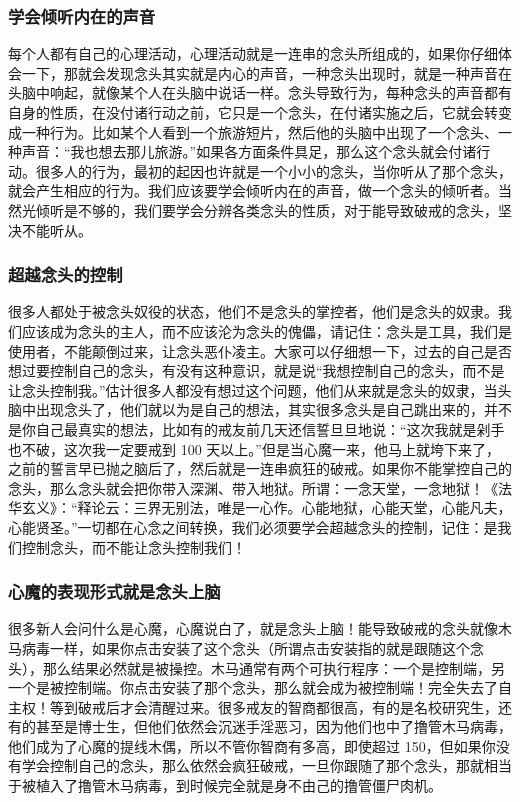 \subsubsection{学会倾听内在的声音}

每个人都有自己的心理活动，心理活动就是一连串的念头所组成的，如果你仔细体会一下，那就会发现念头其实就是内心的声音，一种念头出现时，就是一种声音在头脑中响起，就像某个人在头脑中说话一样。念头导致行为，每种念头的声音都有自身的性质，在没付诸行动之前，它只是一个念头，在付诸实施之后，它就会转变成一种行为。比如某个人看到一个旅游短片，然后他的头脑中出现了一个念头、一种声音：“我也想去那儿旅游。”如果各方面条件具足，那么这个念头就会付诸行动。很多人的行为，最初的起因也许就是一个小小的念头，当你听从了那个念头，就会产生相应的行为。我们应该要学会倾听内在的声音，做一个念头的倾听者。当然光倾听是不够的，我们要学会分辨各类念头的性质，对于能导致破戒的念头，坚决不能听从。

\subsubsection{超越念头的控制}

很多人都处于被念头奴役的状态，他们不是念头的掌控者，他们是念头的奴隶。我们应该成为念头的主人，而不应该沦为念头的傀儡，请记住：念头是工具，我们是使用者，不能颠倒过来，让念头恶仆凌主。大家可以仔细想一下，过去的自己是否想过要控制自己的念头，有没有这种意识，就是说“我想控制自己的念头，而不是让念头控制我。”估计很多人都没有想过这个问题，他们从来就是念头的奴隶，当头脑中出现念头了，他们就以为是自己的想法，其实很多念头是自己跳出来的，并不是你自己最真实的想法，比如有的戒友前几天还信誓旦旦地说：“这次我就是剁手也不破，这次我一定要戒到 100 天以上。”但是当心魔一来，他马上就垮下来了，之前的誓言早已抛之脑后了，然后就是一连串疯狂的破戒。如果你不能掌控自己的念头，那么念头就会把你带入深渊、带入地狱。所谓：一念天堂，一念地狱！《法华玄义》：“释论云：三界无别法，唯是一心作。心能地狱，心能天堂，心能凡夫，心能贤圣。”一切都在心念之间转换，我们必须要学会超越念头的控制，记住：是我们控制念头，而不能让念头控制我们！

\subsubsection{心魔的表现形式就是念头上脑}

很多新人会问什么是心魔，心魔说白了，就是念头上脑！能导致破戒的念头就像木马病毒一样，如果你点击安装了这个念头（所谓点击安装指的就是跟随这个念头），那么结果必然就是被操控。木马通常有两个可执行程序：一个是控制端，另一个是被控制端。你点击安装了那个念头，那么就会成为被控制端！完全失去了自主权！等到破戒后才会清醒过来。很多戒友的智商都很高，有的是名校研究生，还有的甚至是博士生，但他们依然会沉迷手淫恶习，因为他们也中了撸管木马病毒，他们成为了心魔的提线木偶，所以不管你智商有多高，即使超过 150，但如果你没有学会控制自己的念头，那么依然会疯狂破戒，一旦你跟随了那个念头，那就相当于被植入了撸管木马病毒，到时候完全就是身不由己的撸管僵尸肉机。


